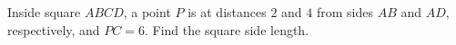 Inside square $ABCD$, a point $P$ is at distances $2$ and $4$ from sides $AB$ and $AD$, respectively, and $PC=6$. Find the square side length.
